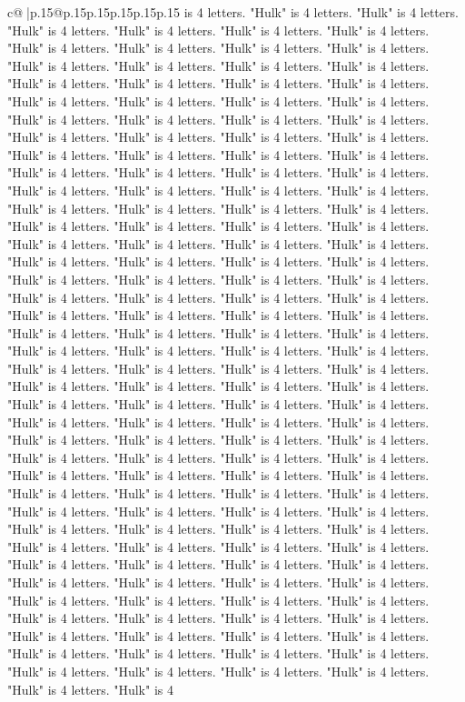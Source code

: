 \documentclass{article}
\begin{document}
{\begin{supertabular}{c@{$\;$}|p{.15\linewidth}@{}p{.15\linewidth}p{.15\linewidth}p{.15\linewidth}p{.15\linewidth}p{.15\linewidth}}
{{{is 4 letters. "Hulk" is 4 letters. "Hulk" is 4 letters. "Hulk" is 4 letters. "Hulk" is 4 letters. "Hulk" is 4 letters. "Hulk" is 4 letters. "Hulk" is 4 letters. "Hulk" is 4 letters. "Hulk" is 4 letters. "Hulk" is 4 letters. "Hulk" is 4 letters. "Hulk" is 4 letters. "Hulk" is 4 letters. "Hulk" is 4 letters. "Hulk" is 4 letters. "Hulk" is 4 letters. "Hulk" is 4 letters. "Hulk" is 4 letters. "Hulk" is 4 letters. "Hulk" is 4 letters. "Hulk" is 4 letters. "Hulk" is 4 letters. "Hulk" is 4 letters. "Hulk" is 4 letters. "Hulk" is 4 letters. "Hulk" is 4 letters. "Hulk" is 4 letters. "Hulk" is 4 letters. "Hulk" is 4 letters. "Hulk" is 4 letters. "Hulk" is 4 letters. "Hulk" is 4 letters. "Hulk" is 4 letters. "Hulk" is 4 letters. "Hulk" is 4 letters. "Hulk" is 4 letters. "Hulk" is 4 letters. "Hulk" is 4 letters. "Hulk" is 4 letters. "Hulk" is 4 letters. "Hulk" is 4 letters. "Hulk" is 4 letters. "Hulk" is 4 letters. "Hulk" is 4 letters. "Hulk" is 4 letters. "Hulk" is 4 letters. "Hulk" is 4 letters. "Hulk" is 4 letters. "Hulk" is 4 letters. "Hulk" is 4 letters. "Hulk" is 4 letters. "Hulk" is 4 letters. "Hulk" is 4 letters. "Hulk" is 4 letters. "Hulk" is 4 letters. "Hulk" is 4 letters. "Hulk" is 4 letters. "Hulk" is 4 letters. "Hulk" is 4 letters. "Hulk" is 4 letters. "Hulk" is 4 letters. "Hulk" is 4 letters. "Hulk" is 4 letters. "Hulk" is 4 letters. "Hulk" is 4 letters. "Hulk" is 4 letters. "Hulk" is 4 letters. "Hulk" is 4 letters. "Hulk" is 4 letters. "Hulk" is 4 letters. "Hulk" is 4 letters. "Hulk" is 4 letters. "Hulk" is 4 letters. "Hulk" is 4 letters. "Hulk" is 4 letters. "Hulk" is 4 letters. "Hulk" is 4 letters. "Hulk" is 4 letters. "Hulk" is 4 letters. "Hulk" is 4 letters. "Hulk" is 4 letters. "Hulk" is 4 letters. "Hulk" is 4 letters. "Hulk" is 4 letters. "Hulk" is 4 letters. "Hulk" is 4 letters. "Hulk" is 4 letters. "Hulk" is 4 letters. "Hulk" is 4 letters. "Hulk" is 4 letters. "Hulk" is 4 letters. "Hulk" is 4 letters. "Hulk" is 4 letters. "Hulk" is 4 letters. "Hulk" is 4 letters. "Hulk" is 4 letters. "Hulk" is 4 letters. "Hulk" is 4 letters. "Hulk" is 4 letters. "Hulk" is 4 letters. "Hulk" is 4 letters. "Hulk" is 4 letters. "Hulk" is 4 letters. "Hulk" is 4 letters. "Hulk" is 4 letters. "Hulk" is 4 letters. "Hulk" is 4 letters. "Hulk" is 4 letters. "Hulk" is 4 letters. "Hulk" is 4 letters. "Hulk" is 4 letters. "Hulk" is 4 letters. "Hulk" is 4 letters. "Hulk" is 4 letters. "Hulk" is 4 letters. "Hulk" is 4 letters. "Hulk" is 4 letters. "Hulk" is 4 letters. "Hulk" is 4 letters. "Hulk" is 4 letters. "Hulk" is 4 letters. "Hulk" is 4 letters. "Hulk" is 4 letters. "Hulk" is 4 letters. "Hulk" is 4 letters. "Hulk" is 4 letters. "Hulk" is 4 letters. "Hulk" is 4 letters. "Hulk" is 4 letters. "Hulk" is 4 letters. "Hulk" is 4 letters. "Hulk" is 4 letters. "Hulk" is 4 letters. "Hulk" is 4 letters. "Hulk" is 4 letters. "Hulk" is 4 letters. "Hulk" is 4 letters. "Hulk" is 4 letters. "Hulk" is 4 letters. "Hulk" is 4 letters. "Hulk" is 4 letters. "Hulk" is 4 letters. "Hulk" is 4 letters. "Hulk" is 4 letters. "Hulk" is 4 letters. "Hulk" is 4 letters. "Hulk" is 4 letters. "Hulk" is 4 letters. "Hulk" is 4 letters. "Hulk" is 4 letters. "Hulk" is 4 letters. "Hulk" is 4 }}}
\end{supertabular}}
\end{document}
